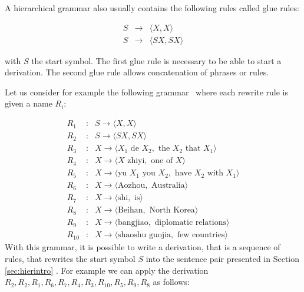   A hierarchical grammar also usually contains the following rules called glue rules:

  \begin{eqnarray}
    S &\rightarrow& \langle X, X \rangle \nonumber \\
    S &\rightarrow& \langle S X, S X \rangle \nonumber
  \end{eqnarray}

  \noindent with $S$ the start symbol. The first glue rule is necessary to be able to start a derivation.
  The second glue rule allows concatenation of phrases or rules.

  Let us consider for example the following grammar~\citep{chiang:2007:CL} where each rewrite rule is given a name $R_i$:

  \begin{eqnarray}
    R_1&:& S \rightarrow \langle X, X \rangle \nonumber \\
    R_2&:& S \rightarrow \langle S X, S X \rangle \nonumber \\
    R_3&:& X \rightarrow \langle X_1 \mbox{ de } X_2, \mbox{ the } X_2 \mbox{ that } X_1 \rangle \nonumber \\
    R_4&:& X \rightarrow \langle X \mbox{ zhiyi}, \mbox{ one of } X \rangle \nonumber \\
    R_5&:& X \rightarrow \langle \mbox{yu } X_1 \mbox{ you } X_2, \mbox{ have } X_2 \mbox{ with } X_1 \rangle \nonumber \\
    R_6&:& X \rightarrow \langle \mbox{Aozhou}, \mbox{ Australia} \rangle \nonumber \\
    R_7&:& X \rightarrow \langle \mbox{shi}, \mbox{ is} \rangle \nonumber \\
    R_8&:& X \rightarrow \langle \mbox{Beihan}, \mbox{ North Korea} \rangle \nonumber \\
    R_9&:& X \rightarrow \langle \mbox{bangjiao}, \mbox{ diplomatic relations} \rangle \nonumber \\
    R_{10}&:& X \rightarrow \langle \mbox{shaoshu guojia}, \mbox{ few countries} \rangle \nonumber
  \end{eqnarray}
%
  With this grammar, it is possible to write a derivation, that is a sequence of rules, that rewrites the start symbol $S$ into the sentence pair presented in Section \ref{sec:hierintro} \cite{chiang:2007:CL}. For example we can apply the derivation \linebreak $R_2,R_2,R_1,R_6,R_7,R_4,R_3,R_{10},R_5,R_9,R_8$ as
  follows:


